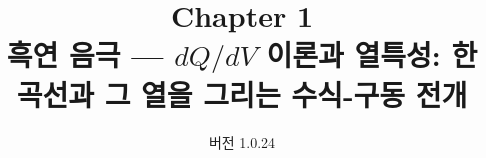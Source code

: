 
\renewcommand{\theequation}{1.\arabic{equation}}
\renewcommand{\thesection}{1.\arabic{section}}

\title{\textbf{\LARGE Chapter 1}\\[0.35em]\Large 흑연 음극 --- $dQ/dV$ 이론과 열특성: 한 곡선과 그 열을 그리는 수식-구동 전개}
\author{}
\date{\normalsize 버전 1.0.24}


\maketitle

































